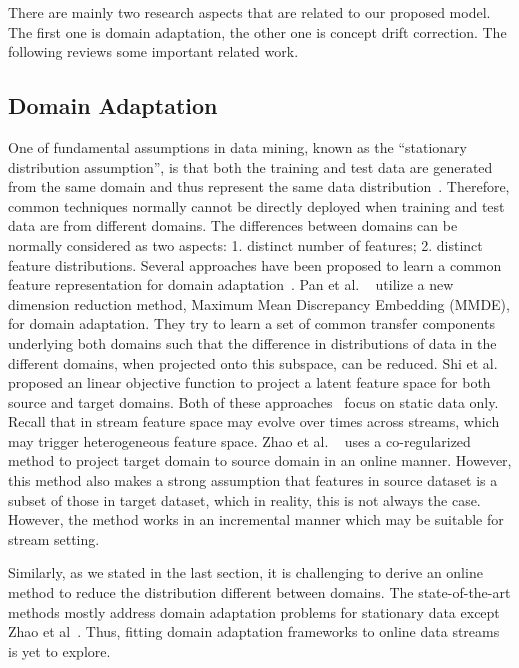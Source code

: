 There are mainly two research aspects that are related to our proposed model. 
The first one is domain adaptation, the other one is concept drift correction. The following reviews some important related work.

\subsection{Domain Adaptation}

One of fundamental assumptions in data mining, known as the ``stationary distribution assumption'', is that both the training and test data are generated from the same domain and thus represent the same data distribution~\cite{zadrozny2004learning}. Therefore, common techniques normally cannot be directly deployed when training and test data are from different domains. The differences between domains can be normally considered as two aspects: 1. distinct number of features; 2. distinct feature distributions. Several approaches have been proposed to learn a common feature representation for domain adaptation~\cite{journals/ml/Ben-DavidBCKPV10,pan2010survey}. Pan et al. ~\cite{conf/aaai/PanKY08} utilize a new dimension reduction method, Maximum Mean Discrepancy Embedding (MMDE), for domain adaptation. They try to learn a set of common transfer components underlying both domains such that the difference in distributions of data in the different domains, when projected onto this subspace, can be reduced. Shi et al.~\cite{shi2010transfer} proposed an linear objective function to project a latent feature space for both source and target domains. Both of these approaches~\cite{shi2010transfer, conf/aaai/PanKY08} focus on  static data only. Recall that in stream feature space may evolve over times across streams, which may trigger heterogeneous feature space. Zhao et al. ~\cite{zhao2010otl} uses a co-regularized method to project target domain to source domain in an online manner. However, this method also makes a strong assumption that features in source dataset is a subset of those in target dataset, which in reality, this is not always the case. However, the method works in an incremental manner which may be suitable for stream setting.

Similarly, as we stated in the last section, it is challenging to derive an online method to reduce the distribution different between domains. The state-of-the-art methods mostly address domain adaptation problems for stationary data except Zhao et al~\cite{zhao2010otl}. Thus, fitting domain adaptation frameworks to online data streams is yet to explore.



